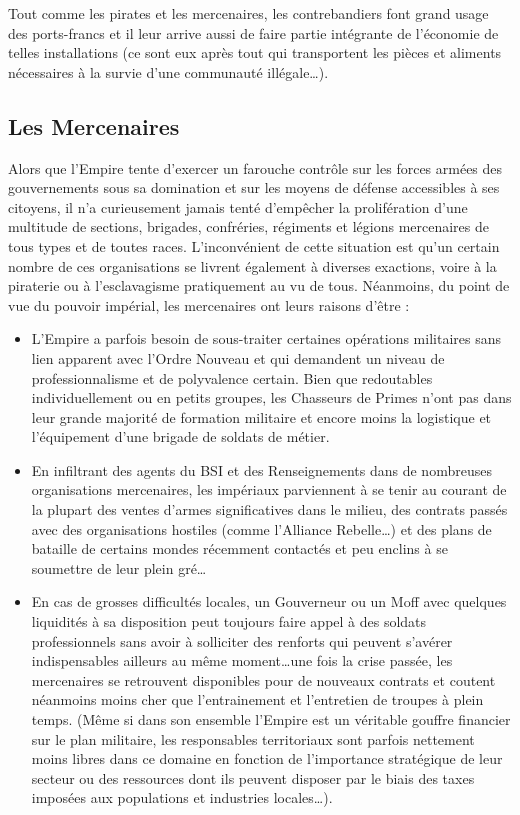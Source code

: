 \documentclass[twoside]{article}
\begin{document}
Tout comme les pirates et les mercenaires, les contrebandiers font grand usage des ports-francs et il leur arrive aussi de faire partie intégrante de l'économie de telles installations (ce sont eux après tout qui transportent les pièces et aliments nécessaires à la survie d'une communauté illégale\ldots).

\subsection{Les Mercenaires}
Alors que l'Empire tente d'exercer un farouche contrôle sur les forces armées des gouvernements sous sa domination et sur les moyens de défense accessibles à ses citoyens, il n'a curieusement jamais tenté d'empêcher la prolifération d'une multitude de sections, brigades, confréries, régiments et légions mercenaires de tous types et de toutes races. L'inconvénient de cette situation est qu'un certain nombre de ces organisations se livrent également à diverses exactions, voire à la piraterie ou à l'esclavagisme pratiquement au vu de tous. Néanmoins, du point de vue du pouvoir impérial, les mercenaires ont leurs raisons d'être :

\begin{itemize}
	\item L'Empire a parfois besoin de sous-traiter certaines opérations militaires sans lien apparent avec l'Ordre Nouveau et qui demandent un niveau de professionnalisme et de polyvalence certain. Bien que redoutables individuellement ou en petits groupes, les Chasseurs de Primes n'ont pas dans leur grande majorité de formation militaire et encore moins la logistique et l'équipement d'une brigade de soldats de métier.
	\item En infiltrant des agents du BSI et des Renseignements dans de nombreuses organisations mercenaires, les impériaux parviennent à se tenir au courant de la plupart des ventes d'armes significatives dans le milieu, des contrats passés avec des organisations hostiles (comme l'Alliance Rebelle\ldots) et des plans de bataille de certains mondes récemment contactés et peu enclins à se soumettre de leur plein gré\ldots
	\item En cas de grosses difficultés locales, un Gouverneur ou un Moff avec quelques liquidités à sa disposition peut toujours faire appel à des soldats professionnels sans avoir à solliciter des renforts qui peuvent s'avérer indispensables ailleurs au même moment\ldots une fois la crise passée, les mercenaires se retrouvent disponibles pour de nouveaux contrats et coutent néanmoins moins cher que l'entrainement et l'entretien de troupes à plein temps. (Même si dans son ensemble l'Empire est un véritable gouffre financier sur le plan militaire, les responsables territoriaux sont parfois nettement moins libres dans ce domaine en fonction de l'importance stratégique de leur secteur ou des ressources dont ils peuvent disposer par le biais des taxes imposées aux populations et industries locales\ldots). 
\end{itemize}
\end{document}
